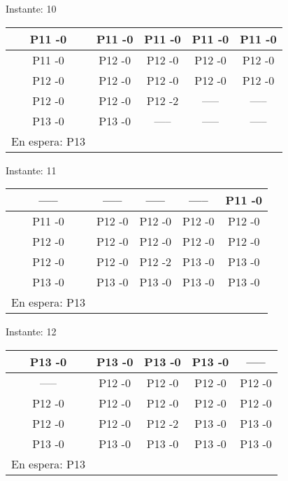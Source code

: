 \documentclass[10pt,a4paper]{article}
\begin{document}
\pagebreak
\begin{center}

Instante: 10

\hfill 
\hfill 
\hfill 
\break 
\begin{tabular}	{ccccc}
\hline  P11 -0 &   P11 -0 &   P11 -0 &   P11 -0 &   P11 -0 &  \\\hline  P11 -0 &   P12 -0 &   P12 -0 &   P12 -0 &   P12 -0 &  \\\hline  P12 -0 &   P12 -0 &   P12 -0 &   P12 -0 &   P12 -0 &  \\\hline  P12 -0 &   P12 -0 &   P12 -2 &   ----- &   ----- &  \\\hline  P13 -0 &   P13 -0 &   ----- &   ----- &   ----- &  \\\hfill 
\hfill 
\hfill 
\break 
En espera: 	P13 
\end{tabular}
\end{center}
\pagebreak
\begin{center}

Instante: 11

\hfill 
\hfill 
\hfill 
\break 
\begin{tabular}	{ccccc}
\hline  ----- &   ----- &   ----- &   ----- &   P11 -0 &  \\\hline  P11 -0 &   P12 -0 &   P12 -0 &   P12 -0 &   P12 -0 &  \\\hline  P12 -0 &   P12 -0 &   P12 -0 &   P12 -0 &   P12 -0 &  \\\hline  P12 -0 &   P12 -0 &   P12 -2 &   P13 -0 &   P13 -0 &  \\\hline  P13 -0 &   P13 -0 &   P13 -0 &   P13 -0 &   P13 -0 &  \\\hfill 
\hfill 
\hfill 
\break 
En espera: 	P13 
\end{tabular}
\end{center}
\pagebreak
\begin{center}

Instante: 12

\hfill 
\hfill 
\hfill 
\break 
\begin{tabular}	{ccccc}
\hline  P13 -0 &   P13 -0 &   P13 -0 &   P13 -0 &   ----- &  \\\hline  ----- &   P12 -0 &   P12 -0 &   P12 -0 &   P12 -0 &  \\\hline  P12 -0 &   P12 -0 &   P12 -0 &   P12 -0 &   P12 -0 &  \\\hline  P12 -0 &   P12 -0 &   P12 -2 &   P13 -0 &   P13 -0 &  \\\hline  P13 -0 &   P13 -0 &   P13 -0 &   P13 -0 &   P13 -0 &  \\\hfill 
\hfill 
\hfill 
\break 
En espera: 	P13 
\end{tabular}
\end{center}
\end{document}
